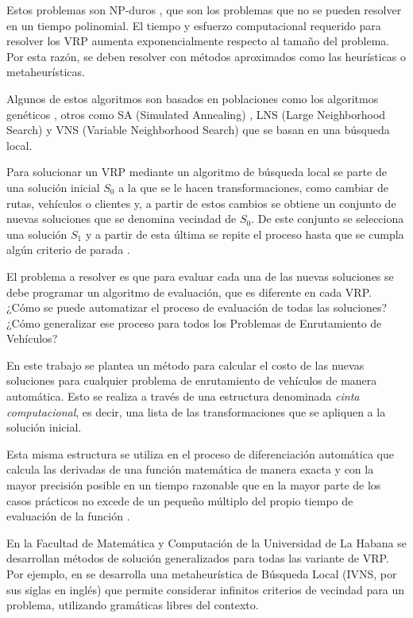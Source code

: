 Estos problemas son NP-duros \cite{Garey}, que son los problemas que no se pueden resolver en un tiempo polinomial. El tiempo y esfuerzo computacional requerido para resolver los VRP aumenta exponencialmente respecto al tamaño del problema. Por esta razón, se deben resolver con métodos aproximados como las heurísticas o metaheurísticas.

Algunos de estos algoritmos son basados en poblaciones como los algoritmos genéticos \cite{Mester}, otros como SA (Simulated Annealing) \cite{Liu}, LNS (Large Neighborhood Search) \cite{Ropke} y VNS (Variable Neighborhood Search) \cite{Camila} que se basan en una búsqueda local.

Para solucionar un VRP mediante un algoritmo de búsqueda local se parte de una solución inicial $S_{0}$ a la que se le hacen transformaciones, como cambiar de rutas, vehículos o clientes y, a partir de estos cambios se obtiene un conjunto de nuevas soluciones que se denomina vecindad de $S_{0}$. De este conjunto se selecciona una solución $S_{1}$ y a partir de esta última se repite el proceso hasta que se cumpla algún criterio de parada \cite{JJ}. 

El problema a resolver es que para evaluar cada una de las nuevas soluciones se debe programar un algoritmo de evaluación, que es diferente en cada VRP. ¿Cómo se puede automatizar el proceso de evaluación de todas las soluciones? ¿Cómo generalizar ese proceso para todos los Problemas de Enrutamiento de Vehículos?

En este trabajo se plantea un método para calcular el costo de las nuevas soluciones para cualquier problema de enrutamiento de vehículos de manera automática. Esto se realiza a través de una estructura denominada \textit{cinta computacional}, es decir, una lista de las transformaciones que se apliquen a la solución inicial.

Esta misma estructura se utiliza en el proceso de diferenciación automática que calcula las derivadas de una función matemática de manera exacta y con la mayor precisión posible en un tiempo razonable que en la mayor parte de los casos prácticos no excede de un pequeño múltiplo del propio tiempo de evaluación de la función \cite{Manuel,Griewank}.

En la Facultad de Matemática y Computación de la Universidad de La Habana se desarrollan métodos de solución generalizados para todas las variante de VRP. Por ejemplo, en \cite{Camila} se desarrolla una metaheurística de Búsqueda Local (IVNS, por sus siglas en inglés) que permite considerar infinitos criterios de vecindad para un problema, utilizando gramáticas libres del contexto. 

